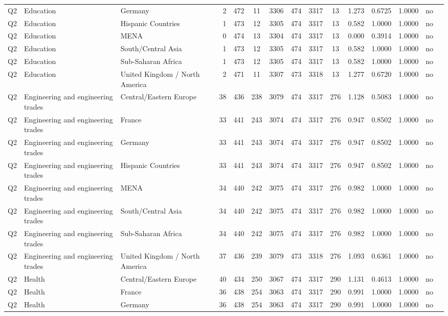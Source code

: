 \begin{longtable}{lllrcccccccccll}
Q2 & Education & Germany & 2 & 472 & 11 & 3306 & 474 & 3317 & 13 & 1.273 & 0.6725 & 1.0000 & no \\
Q2 & Education & Hispanic Countries & 1 & 473 & 12 & 3305 & 474 & 3317 & 13 & 0.582 & 1.0000 & 1.0000 & no \\
Q2 & Education & MENA & 0 & 474 & 13 & 3304 & 474 & 3317 & 13 & 0.000 & 0.3914 & 1.0000 & no \\
Q2 & Education & South/Central Asia & 1 & 473 & 12 & 3305 & 474 & 3317 & 13 & 0.582 & 1.0000 & 1.0000 & no \\
Q2 & Education & Sub-Saharan Africa & 1 & 473 & 12 & 3305 & 474 & 3317 & 13 & 0.582 & 1.0000 & 1.0000 & no \\
Q2 & Education & United Kingdom / North America & 2 & 471 & 11 & 3307 & 473 & 3318 & 13 & 1.277 & 0.6720 & 1.0000 & no \\
Q2 & Engineering and engineering trades & Central/Eastern Europe & 38 & 436 & 238 & 3079 & 474 & 3317 & 276 & 1.128 & 0.5083 & 1.0000 & no \\
Q2 & Engineering and engineering trades & France & 33 & 441 & 243 & 3074 & 474 & 3317 & 276 & 0.947 & 0.8502 & 1.0000 & no \\
Q2 & Engineering and engineering trades & Germany & 33 & 441 & 243 & 3074 & 474 & 3317 & 276 & 0.947 & 0.8502 & 1.0000 & no \\
Q2 & Engineering and engineering trades & Hispanic Countries & 33 & 441 & 243 & 3074 & 474 & 3317 & 276 & 0.947 & 0.8502 & 1.0000 & no \\
Q2 & Engineering and engineering trades & MENA & 34 & 440 & 242 & 3075 & 474 & 3317 & 276 & 0.982 & 1.0000 & 1.0000 & no \\
Q2 & Engineering and engineering trades & South/Central Asia & 34 & 440 & 242 & 3075 & 474 & 3317 & 276 & 0.982 & 1.0000 & 1.0000 & no \\
Q2 & Engineering and engineering trades & Sub-Saharan Africa & 34 & 440 & 242 & 3075 & 474 & 3317 & 276 & 0.982 & 1.0000 & 1.0000 & no \\
Q2 & Engineering and engineering trades & United Kingdom / North America & 37 & 436 & 239 & 3079 & 473 & 3318 & 276 & 1.093 & 0.6361 & 1.0000 & no \\
Q2 & Health & Central/Eastern Europe & 40 & 434 & 250 & 3067 & 474 & 3317 & 290 & 1.131 & 0.4613 & 1.0000 & no \\
Q2 & Health & France & 36 & 438 & 254 & 3063 & 474 & 3317 & 290 & 0.991 & 1.0000 & 1.0000 & no \\
Q2 & Health & Germany & 36 & 438 & 254 & 3063 & 474 & 3317 & 290 & 0.991 & 1.0000 & 1.0000 & no \\

\end{longtable}
